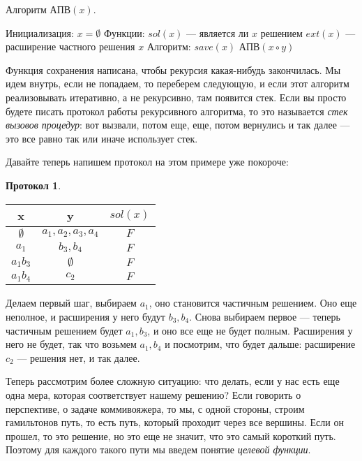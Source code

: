 \documentclass[russian]{lecture-notes}
\theoremstyle{definition}
\newtheorem*{prot}{Протокол}
\begin{document}
\begin{example*}
		\begin{algorithm}[H]
			\caption{Алгоритм АПВ$(x)$.}
			\label{alg:two}
			\begin{algorithmic}
				\State Инициализация:
				\State $x = \emptyset$
				\State Функции:
				\State $sol(x)$ --- является ли $x$ решением
				\State $ext(x)$ --- расширение частного решения $x$
				\State Алгоритм:
					\State $save(x)$
				\Else 
						\State АПВ$(x \circ y)$ 
					\EndFor
				\EndIf
			\end{algorithmic}
		\end{algorithm}
	
		Функция сохранения написана, чтобы рекурсия какая-нибудь закончилась.
		Мы идем внутрь, если не попадаем, то переберем следующую, и если этот алгоритм реализовывать итеративно, а не рекурсивно, там появится стек.
		Если вы просто будете писать протокол работы рекурсивного алгоритма, то это называется {\em стек вызовов процедур}: вот вызвали, потом еще, еще, потом вернулись и так далее --- это все равно так или иначе использует стек.
		
		Давайте теперь напишем протокол на этом примере уже покороче:
		
		\begin{prot}
			\begin{tabular} {c|c|c}
				x & y & $sol(x)$ \\\hline
				$\emptyset$ & $a_1, a_2, a_3, a_4$ & $F$ \\\hline 
				$a_1$ & $b_3, b_4$ & $F$ \\\hline 
				$a_1 b_3$ & $\emptyset$ & $F$ \\\hline 
				$a_1 b_4$ & $c_2 $ & $F$ \\
			\end{tabular}
			
			Делаем первый шаг, выбираем $a_1$, оно становится частичным решением. Оно еще неполное, и расширения у него будут $b_3, b_4$. Снова выбираем первое --- теперь частичным решением будет $a_1, b_3$, и оно все еще не будет полным. Расширения у него не будет, так что возьмем $a_1, b_4$ и посмотрим, что будет дальше: расширение $c_2$ --- решения нет, и так далее.  
		\end{prot}
		
		Теперь рассмотрим более сложную ситуацию: что делать, если у нас есть еще одна мера, которая соответствует нашему решению?
		Если говорить о перспективе, о задаче коммивояжера, то мы, с одной стороны, строим гамильтонов путь, то есть путь, который проходит через все вершины.
		Если он прошел, то это решение, но это еще не значит, что это самый короткий путь.
		Поэтому для каждого такого пути мы введем понятие {\em целевой функции}. 
		

\end{example*}
\end{document}

